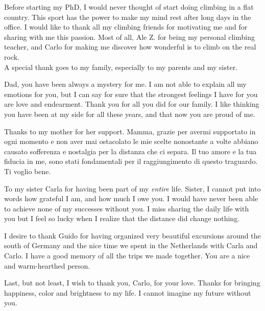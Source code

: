 Before starting my PhD, I would never thought of start doing climbing in a flat country. This sport has the power to make my mind rest after long days in the office.
I would like to thank all my climbing friends for motivating me and for sharing with me this passion. Most of all, Ale Z. for being my personal climbing teacher, and Carlo for making me discover how wonderful is to climb on the real rock.\\ 

A special thank goes to my family, especially to my parents and my sister.

Dad, you have been always a mystery for me. I am not able to explain all my emotions for you, but I can say for sure that the strongest feelings I have for you are love and endearment. Thank you for all you did for our family. I like thinking you have been at my side for all these years, and that now you are proud of me.

Thanks to my mother for her support. Mamma, grazie per avermi supportato in ogni momento e non aver mai ostacolato le mie scelte nonostante a volte abbiano causato sofferenza e nostalgia per la distanza che ci separa. Il tuo amore e la tua fiducia in me, sono stati fondamentali per il raggiungimento di questo traguardo. Ti voglio bene.   

To my sister Carla for having been part of my \textit{entire} life. Sister, I cannot put into words how grateful I am, and how much I owe you. I would have never been able to achieve none of my successes without you.
I miss sharing the daily life with you but I feel so lucky when I realize that the distance did change nothing. 

I desire to thank Guido for having organized very beautiful excursions around the south of Germany and the nice time we spent in the Netherlands with Carla and Carlo. I have a good memory of all the trips we made together. You are a nice and warm-hearthed person.

Last, but not least, I wish to thank you, Carlo, for your love. 
Thanks for bringing happiness, color and brightness to my life. I cannot imagine my future without you.
